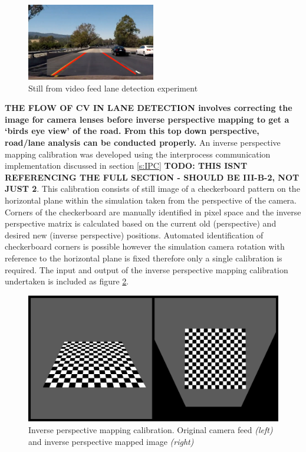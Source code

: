 \documentclass[]{aiaa-tc}%
\begin{document}
\begin{figure} %
	\centering
	\includegraphics[width=0.5\textwidth, height=0.5\textwidth]{early_lane_detection_experiment.png}
	\caption{Still from video feed lane detection experiment}
	\label{f:simpleLaneDetectionHough}
\end{figure}

\textbf{THE FLOW OF CV IN LANE DETECTION involves correcting the image for camera lenses before inverse perspective mapping to get a `birds eye view' of the road. From this top down perspective, road/lane analysis can be conducted properly.} An inverse perspective mapping calibration was developed using the interprocess communication implementation discussed in section \ref{s:IPC} \textbf{TODO: THIS ISNT REFERENCING THE FULL SECTION - SHOULD BE III-B-2, NOT JUST 2}. This calibration consists of still image of a checkerboard pattern on the horizontal plane within the simulation taken from the perspective of the camera. Corners of the checkerboard are manually identified in pixel space and the inverse perspective matrix is calculated based on the current old (perspective) and desired new (inverse perspective) positions. Automated identification of checkerboard corners is possible however the simulation camera rotation with reference to the horizontal plane is fixed therefore only a single calibration is required. The input and output of the inverse perspective mapping calibration undertaken is included as figure \ref{f:inverse_perspective_calibration}.

\begin{figure}[htb]%
	\includegraphics{InversePerspectiveEg.png}
	\caption{Inverse perspective mapping calibration. Original camera feed \textit{(left)} and inverse perspective mapped image \textit{(right)}}
	\label{f:inverse_perspective_calibration}
\end{figure}
\end{document}
